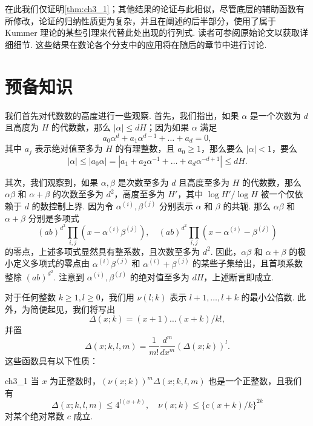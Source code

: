 在此我们仅证明\autoref{thm:ch3_1}；其他结果的论证与此相似，尽管底层的辅助函数有所修改，论证的归纳性质更为复杂，并且在阐述的后半部分，使用了属于 Kummer 理论的某些引理来代替此处出现的行列式. 读者可参阅原始论文以获取详细细节. 这些结果在数论各个分支中的应用将在随后的章节中进行讨论.

\section{预备知识}\label{sec:ch3_2}

我们首先对代数数的高度进行一些观察. 首先，我们指出，如果 $\alpha$ 是一个次数为 $d$ 且高度为 $H$ 的代数数，那么 $|\alpha| \le dH$；因为如果 $\alpha$ 满足
\[
a_0\alpha^d + a_1\alpha^{d-1} + \dots + a_d = 0,
\]
其中 $a_j$ 表示绝对值至多为 $H$ 的有理整数，且 $a_0 \ge 1$，那么要么 $|\alpha| < 1$，要么
\[
|\alpha| \le |a_0\alpha| = |a_1 + a_2\alpha^{-1} + \dots + a_d\alpha^{-d+1}| \le dH.
\]

其次，我们观察到，如果 $\alpha, \beta$ 是次数至多为 $d$ 且高度至多为 $H$ 的代数数，那么 $\alpha\beta$ 和 $\alpha + \beta$ 的次数至多为 $d^2$，高度至多为 $H'$，其中 $\log H'/\log H$ 被一个仅依赖于 $d$ 的数控制上界. 因为令 $\alpha^{(i)}, \beta^{(j)}$ 分别表示 $\alpha$ 和 $\beta$ 的共轭. 那么 $\alpha\beta$ 和 $\alpha + \beta$ 分别是多项式
\[
(ab)^{d^2} \prod_{i,j} (x - \alpha^{(i)}\beta^{(j)}), \quad (ab)^{d^2} \prod_{i,j} (x - \alpha^{(i)} - \beta^{(j)})
\]
的零点，上述多项式显然具有整系数，且次数至多为 $d^2$. 因此，$\alpha\beta$ 和 $\alpha + \beta$ 的极小定义多项式的零点由 $\alpha^{(i)}\beta^{(j)}$ 和 $\alpha^{(i)}+\beta^{(j)}$ 的某些子集给出，且首项系数整除 $(ab)^{d^2}$. 注意到 $\alpha^{(i)}, \beta^{(j)}$ 的绝对值至多为 $dH$，上述断言即成立.

对于任何整数 $k \ge 1, l \ge 0$，我们用 $\nu(l;k)$ 表示 $l+1, \dots, l+k$ 的最小公倍数. 此外，为简便起见，我们将写出
\[
\Delta(x; k) = (x+1) \dots (x+k)/k!,
\]
并置
\[
\Delta(x; k, l, m) = \frac{1}{m!} \frac{d^m}{dx^m} (\Delta(x; k))^l.
\]
这些函数具有以下性质：

\begin{mylemma}{}{ch3_1}
当 $x$ 为正整数时，$(\nu(x;k))^m \Delta(x;k,l,m)$ 也是一个正整数，且我们有
\[
\Delta(x; k, l, m) \le 4^{l(x+k)}, \quad \nu(x; k) \le \{c(x+k)/k\}^{2k}
\]
对某个绝对常数 $c$ 成立.
\end{mylemma}

